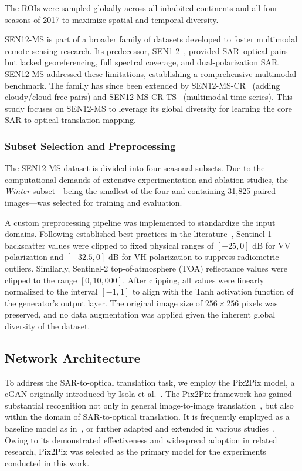 \documentclass[remotesensing,article,submit,pdftex,moreauthors]{Definitions/mdpi}
\begin{document}
The ROIs were sampled globally across all inhabited continents and all four seasons of 2017 to maximize spatial and temporal diversity. 


SEN12-MS is part of a broader family of datasets developed to foster multimodal remote sensing research. Its predecessor, SEN1-2~\cite{sen12_2018}, provided SAR–optical pairs but lacked georeferencing, full spectral coverage, and dual-polarization SAR. SEN12-MS addressed these limitations, establishing a comprehensive multimodal benchmark. The family has since been extended by SEN12-MS-CR~\cite{sen12ms-cr_2021} (adding cloudy/cloud-free pairs) and SEN12-MS-CR-TS~\cite{sen12ms-cr-ts_2022} (multimodal time series). This study focuses on SEN12-MS to leverage its global diversity for learning the core SAR-to-optical translation mapping.

\subsubsection{Subset Selection and Preprocessing}
\label{subsec:preprocessing}
The SEN12-MS dataset is divided into four seasonal subsets. Due to the computational demands of extensive experimentation and ablation studies, the \textit{Winter} subset—being the smallest of the four and containing 31,825 paired images—was selected for training and evaluation.

A custom preprocessing pipeline was implemented to standardize the input domains. Following established best practices in the literature~\cite{CR_SEN2_dRNN, c_guided_fus_s2ot, trans_gan_CF, strgb_lat_diff, transfusion_cr}, Sentinel-1 backscatter values were clipped to fixed physical ranges of $[-25, 0]$ dB for VV polarization and $[-32.5, 0]$ dB for VH polarization to suppress radiometric outliers. Similarly, Sentinel-2 top-of-atmosphere (TOA) reflectance values were clipped to the range $[0, 10,000]$. After clipping, all values were linearly normalized to the interval $[-1, 1]$ to align with the Tanh activation function of the generator's output layer. The original image size of $256 \times 256$ pixels was preserved, and no data augmentation was applied given the inherent global diversity of the dataset.

\subsection{Network Architecture}
To address the SAR-to-optical translation task, we employ the Pix2Pix model, a cGAN originally introduced by Isola et al.~\cite{pix2pix_2018}. The Pix2Pix framework has gained substantial recognition not only in general image-to-image translation~\cite{S2MS_GAN}, but also within the domain of SAR-to-optical translation. It is frequently employed as a baseline model as in~\cite{s2opt_LULC, assessing_MT_cGANS_s2o_crop, CR_SEN2_dRNN, cr_fuse_HR_GEN, hvt_cgan, trans_gan_CF}, or further adapted and extended in various studies~\cite{A_cGAN_fuse_sar_MS_CR, s2opt_LULC}. Owing to its demonstrated effectiveness and widespread adoption in related research, Pix2Pix was selected as the primary model for the experiments conducted in this work.
\end{document}
